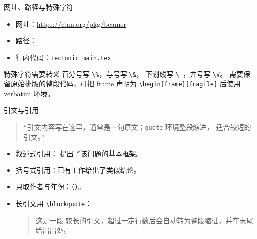 \begin{frame}{网址、路径与特殊字符}
  \begin{itemize}
    \item 网址：\url{https://ctan.org/pkg/beamer}
    \item 路径：
    \item 行内代码：\texttt{tectonic main.tex}
  \end{itemize}

  \begin{block}{特殊字符需要转义}
    百分号写 \texttt{\textbackslash\%}，与号写 \texttt{\textbackslash\&}，
    下划线写 \texttt{\textbackslash\_}，井号写 \texttt{\textbackslash\#}。
    需要保留原始排版的整段代码，可把 frame 声明为
    \texttt{\textbackslash begin\{frame\}[fragile]} 后使用 verbatim 环境。
  \end{block}
\end{frame}

\begin{frame}{引文与引用}
  \begin{quote}
    \enquote{引文内容写在这里，通常是一句原文；\texttt{quote} 环境整段缩进，
    适合较短的引文。}
  \end{quote}

  \vspace{0.3em}
  \begin{itemize}
    \item 叙述式引用：\textcite{example2026} 提出了该问题的基本框架。
    \item 括号式引用：已有工作给出了类似结论\parencite{example2026}。
    \item 只取作者与年份：\citeauthor{example2026}（\citeyear{example2026}）。
    \item 长引文用 \texttt{\textbackslash blockquote}：\blockquote{这是一段
      较长的引文，超过一定行数后会自动转为整段缩进，并在末尾给出出处。}
  \end{itemize}
\end{frame}

